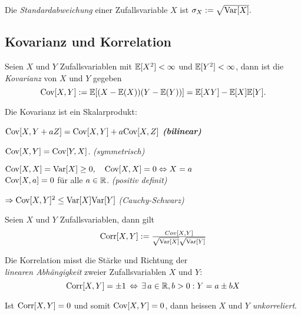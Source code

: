 \begin{definition}[Standardabweichung]
	Die \emph{Standardabweichung} einer Zufallsvariable \(X\) ist
	\(	\sigma_X := \sqrt{\mathrm{Var}[X]}. \)
\end{definition}


\subsection{Kovarianz und Korrelation}

\begin{definition}[Kovarianz]
	Seien \(X\) und \(Y\) Zufallsvariablen mit \(\mathbb{E}[X^2] < \infty\) und \(\mathbb{E}[Y^2] < \infty\),
	dann ist die \emph{Kovarianz} von \(X\) und \(Y\) gegeben
	\[
		\mathrm{Cov}[X,Y] := \mathbb{E}[(X-\mathbb{E}(X))(Y-\mathbb{E}(Y))] = \mathbb{E}[XY]-\mathbb{E}[X]\mathbb{E}[Y].
	\]

	\begin{note}
		Die Kovarianz ist ein Skalarprodukt:
		\begin{compactenum}[i:]
			\item \(\mathrm{Cov}[X,Y+aZ] = \mathrm{Cov}[X,Y] + a\mathrm{Cov}[X,Z]\) \emph{\textbf{(bilinear)}}
			\item \(\mathrm{Cov}[X,Y] = \mathrm{Cov}[Y,X]\).	\emph{(symmetrisch)}
			\item \(\mathrm{Cov}[X,X] = \mathrm{Var}[X] \geq 0, \quad \mathrm{Cov}[X,X]= 0 \Leftrightarrow X=a\)
			\\	 \(\mathrm{Cov}[X,a] = 0\) für alle \(a \in \mathbb{R}\). \emph{(positiv definit)}
		\end{compactenum}
		\(\Rightarrow \mathrm{Cov}[X,Y]^2 \leq \mathrm{Var}[X] \mathrm{Var}[Y] \) \emph{(Cauchy-Schwarz)}
	\end{note}

\end{definition}


\begin{definition}[Korrelation]
	Seien \(X\) und \(Y\) Zufallsvariablen, dann gilt
	\[ \textstyle
		\mathrm{Corr}[X,Y] := \frac{Cov[X,Y]}{\sqrt{\mathrm{Var}[X]}\sqrt{\mathrm{Var}[Y]}}
	\]
\end{definition}


\begin{note}
	Die Korrelation misst die Stärke und Richtung der\\
	\emph{linearen Abhängigkeit} zweier Zufallsvariablen \(X\) und \(Y\):
	\[ \textstyle
		\mathrm{Corr}[X,Y] = \pm 1 \,\Leftrightarrow\, \exists \, a \in \mathbb{R}, b>0: Y = a \pm bX
	\]
\end{note}

\begin{definition}[unkorreliert]
	Ist \(\mathrm{Corr}[X,Y] = 0\) und somit \(\mathrm{Cov}[X,Y]=0\), dann heissen \(X\) und \(Y\) \emph{unkorreliert}.
\end{definition}
